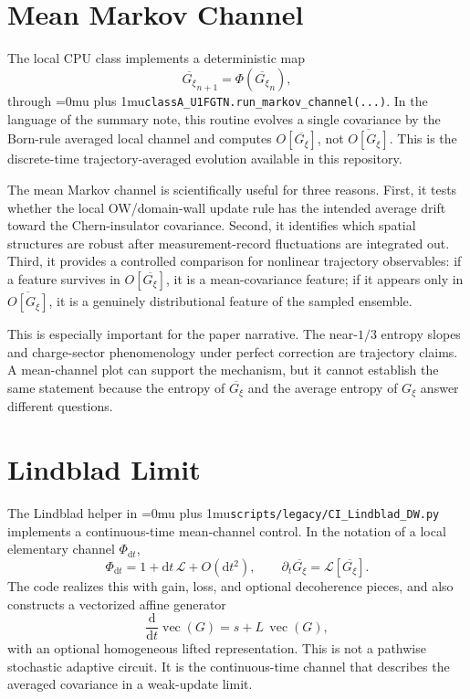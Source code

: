 \documentclass[aps,prb,onecolumn,nofootinbib,superscriptaddress]{revtex4-2}
\newcommand{\src}[1]{\begingroup\ttfamily\Urlmuskip=0mu plus 1mu\relax\nolinkurl{#1}\endgroup}
\newcommand{\avg}[1]{\overline{#1}}
\newcommand{\Gtraj}{G_{\xi}}
\newcommand{\Gbar}{\avg{G_{\xi}}}
\newcommand{\calL}{\mathcal L}
\newcommand{\dd}{\mathrm d}
\begin{document}
\section{Mean Markov Channel}

The local CPU class implements a deterministic map
\begin{equation}
  \Gbar_{n+1}=\Phi(\Gbar_n),
  \label{eq:mean_markov}
\end{equation}
through \src{classA_U1FGTN.run_markov_channel(...)}.  In the language of the
summary note, this routine evolves a single covariance by the Born-rule averaged
local channel and computes \(O[\Gbar]\), not
\(\avg{O[\Gtraj]}\).  This is the discrete-time trajectory-averaged evolution
available in this repository.

The mean Markov channel is scientifically useful for three reasons.
First, it tests whether the local OW/domain-wall update rule has the intended
average drift toward the Chern-insulator covariance.  Second, it identifies
which spatial structures are robust after measurement-record fluctuations are
integrated out.  Third, it provides a controlled comparison for nonlinear
trajectory observables: if a feature survives in \(O[\Gbar]\), it is a
mean-covariance feature; if it appears only in \(\avg{O[\Gtraj]}\), it is a
genuinely distributional feature of the sampled ensemble.

This is especially important for the paper narrative.  The near-\(1/3\)
entropy slopes and charge-sector phenomenology under perfect correction are
trajectory claims.  A mean-channel plot can support the mechanism, but it
cannot establish the same statement because the entropy of \(\Gbar\) and the
average entropy of \(\Gtraj\) answer different questions.

\section{Lindblad Limit}

The Lindblad helper in \src{scripts/legacy/CI_Lindblad_DW.py} implements a continuous-time
mean-channel control.  In the notation of a local elementary channel
\(\Phi_{\dd t}\),
\begin{equation}
  \Phi_{\dd t}=1+\dd t\,\calL+O(\dd t^2),
  \qquad
  \partial_t \Gbar = \calL[\Gbar].
  \label{eq:lindblad_limit}
\end{equation}
The code realizes this with gain, loss, and optional decoherence pieces, and
also constructs a vectorized affine generator
\begin{equation}
  \frac{\dd}{\dd t}\operatorname{vec}(G)
  =
  s + L\,\operatorname{vec}(G),
  \label{eq:affine_generator}
\end{equation}
with an optional homogeneous lifted representation.  This is not a pathwise
stochastic adaptive circuit.  It is the continuous-time channel that describes
the averaged covariance in a weak-update limit.
\end{document}
